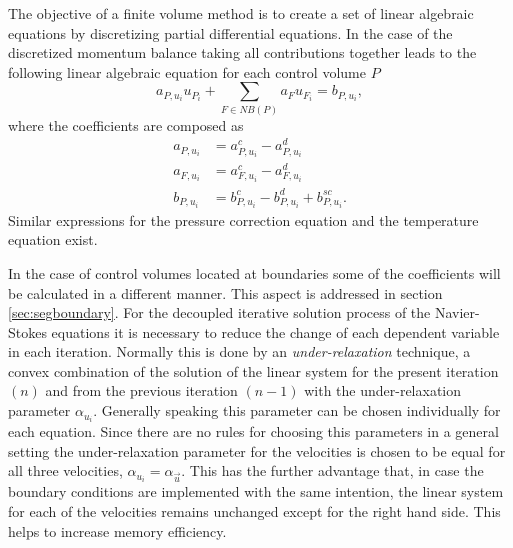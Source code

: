     The objective of a finite volume method is to create a set of linear algebraic equations by discretizing partial differential equations. In the case of the discretized momentum balance taking all contributions together leads to the following linear algebraic equation for each control volume \(P\)
    \begin{displaymath}
      a_{P,u_i} u_{P_i} + \sum_{F \in NB(P)} a_F u_{F_i} = b_{P,u_i},
    \end{displaymath}
    where the coefficients are composed as
    \begin{subequations}
    \begin{align}
      a_{P,u_i} &= a_{P,u_i}^c - a_{P,u_i}^d \\
      a_{F,u_i} &= a_{F,u_i}^c - a_{F,u_i}^d \\
      b_{P,u_i} &= b_{P,u_i}^c - b_{P,u_i}^d + b_{P,u_i}^{sc}.
    \end{align}
    \end{subequations}
    Similar expressions for the pressure correction equation and the temperature equation exist.

    In the case of control volumes located at boundaries some of the coefficients will be calculated in a different manner. This aspect is addressed in section \ref{sec:segboundary}. For the decoupled iterative solution process of the Navier-Stokes equations it is necessary to reduce the change of each dependent variable in each iteration. Normally this is done by an \emph{under-relaxation} technique, a convex combination of the solution of the linear system for the present iteration \((n)\) and from the previous iteration \((n-1)\) with the under-relaxation parameter \(\alpha_{u_i}\). Generally speaking this parameter can be chosen individually for each equation. Since there are no rules for choosing this parameters in a general setting the under-relaxation parameter for the velocities is chosen to be equal for all three velocities, \(\alpha_{u_i} = \alpha_{\vec{u}}\). This has the further advantage that, in case the boundary conditions are implemented with the same intention, the linear system for each of the velocities remains unchanged except for the right hand side. This helps to increase memory efficiency.

